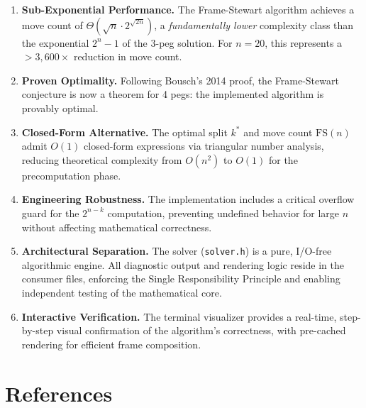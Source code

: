 \documentclass[12pt, a4paper]{article}
\begin{document}
\begin{enumerate}[leftmargin=2em]

\item \textbf{Sub-Exponential Performance.}
The Frame-Stewart algorithm achieves a move count of $\Theta\!\left(\sqrt{n} \cdot 2^{\sqrt{2n}}\right)$, a \emph{fundamentally lower} complexity class than the exponential $2^n - 1$ of the 3-peg solution.
For $n = 20$, this represents a $> 3{,}600\times$ reduction in move count.

\item \textbf{Proven Optimality.}
Following Bousch's 2014 proof, the Frame-Stewart conjecture is now a theorem for 4 pegs: the implemented algorithm is provably optimal.

\item \textbf{Closed-Form Alternative.}
The optimal split $k^*$ and move count $\text{FS}(n)$ admit $O(1)$ closed-form expressions via triangular number analysis, reducing theoretical complexity from $O(n^2)$ to $O(1)$ for the precomputation phase.

\item \textbf{Engineering Robustness.}
The implementation includes a critical overflow guard for the $2^{n-k}$ computation, preventing undefined behavior for large $n$ without affecting mathematical correctness.

\item \textbf{Architectural Separation.}
The solver (\texttt{solver.h}) is a pure, I/O-free algorithmic engine.
All diagnostic output and rendering logic reside in the consumer files, enforcing the Single Responsibility Principle and enabling independent testing of the mathematical core.

\item \textbf{Interactive Verification.}
The terminal visualizer provides a real-time, step-by-step visual confirmation of the algorithm's correctness, with pre-cached rendering for efficient frame composition.

\end{enumerate}


\section{References}
\label{sec:references}
\end{document}
